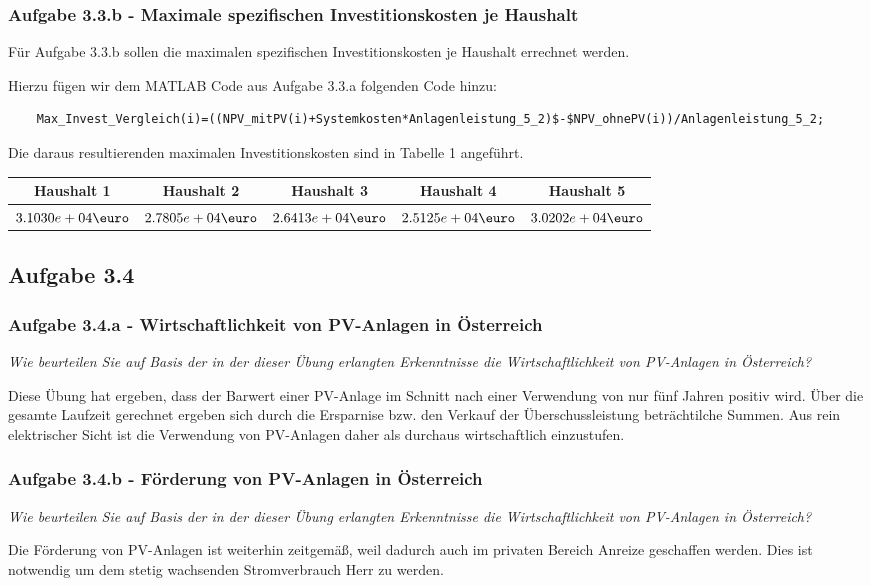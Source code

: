 \documentclass[a4paper,12pt]{article}
\begin{document}
	\subsubsection{Aufgabe 3.3.b - Maximale spezifischen Investitionskosten je Haushalt}
	Für Aufgabe 3.3.b sollen die maximalen spezifischen Investitionskosten je Haushalt errechnet werden.\\ \par
	\noindent Hierzu fügen wir dem MATLAB Code aus Aufgabe 3.3.a folgenden Code hinzu:
	\begin{lstlisting}
	Max_Invest_Vergleich(i)=((NPV_mitPV(i)+Systemkosten*Anlagenleistung_5_2)$-$NPV_ohnePV(i))/Anlagenleistung_5_2;
	\end{lstlisting}
	Die daraus resultierenden maximalen Investitionskosten sind in Tabelle 1 angeführt.
	\begin{table}[H]
		\centering
		\begin{tabular}{|c|c|c|c|c|}
			\hline
			Haushalt 1   & Haushalt 2   & Haushalt 3   & Haushalt 4   & Haushalt 5   \\ \hline
			$3.1030e+04\mbox{\euro}$ & $2.7805e+04\mbox{\euro}$ & $2.6413e+04\mbox{\euro}$ & $2.5125e+04\mbox{\euro}$ & $3.0202e+04\mbox{\euro}$ \\ \hline
		\end{tabular}
	\end{table}
	\subsection{Aufgabe 3.4}
	\subsubsection{Aufgabe 3.4.a - Wirtschaftlichkeit von PV-Anlagen in Österreich}
	\textit{Wie beurteilen Sie auf Basis der in der dieser Übung erlangten Erkenntnisse die Wirtschaftlichkeit von PV-Anlagen in Österreich?}\\ \par
	\noindent Diese Übung hat ergeben, dass der Barwert einer PV-Anlage im Schnitt nach einer Verwendung von nur fünf Jahren positiv wird. Über die gesamte Laufzeit gerechnet ergeben sich durch die Ersparnise bzw. den Verkauf der Überschussleistung beträchtilche Summen. Aus rein elektrischer Sicht ist die Verwendung von PV-Anlagen daher als durchaus wirtschaftlich einzustufen.
	\subsubsection{Aufgabe 3.4.b - Förderung von PV-Anlagen in Österreich}
	\textit{Wie beurteilen Sie auf Basis der in der dieser Übung erlangten Erkenntnisse die Wirtschaftlichkeit von PV-Anlagen in Österreich?}\\ \par
	\noindent Die Förderung von PV-Anlagen ist weiterhin zeitgemäß, weil dadurch auch im privaten Bereich Anreize geschaffen werden. Dies ist notwendig um dem stetig wachsenden Stromverbrauch Herr zu werden.
	\newpage
	\listoffigures
\end{document}
